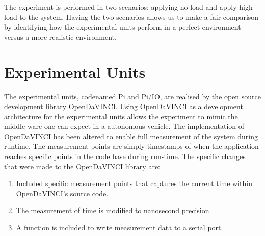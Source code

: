 The experiment is performed in two scenarios: applying no-load and apply high-load to the system. Having the two scenarios allows us to make a fair comparison by identifying how the experimental units perform in a perfect environment versus a more realistic environment.  




\section{Experimental Units}
\label{section:exp-units}

The experimental units, codenamed Pi and Pi/IO, are realised by the open source development library OpenDaVINCI. Using OpenDaVINCI as a development architecture for the experimental units allows the experiment to mimic the middle-ware one can expect in a autonomous vehicle. The implementation of OpenDaVINCI has been altered to enable full measurement of the system during runtime. The measurement points are simply timestamps of when the application reaches specific points in the code base during run-time. The specific changes that were made to the OpenDaVINCI library are: \\

\begin{enumerate}
\item Included specific measurement points that captures the current time within OpenDaVINCI's source code.
\item The measurement of time is modified to nanosecond precision.
\item A function is included to write measurement data to a serial port.\\
\end{enumerate}

